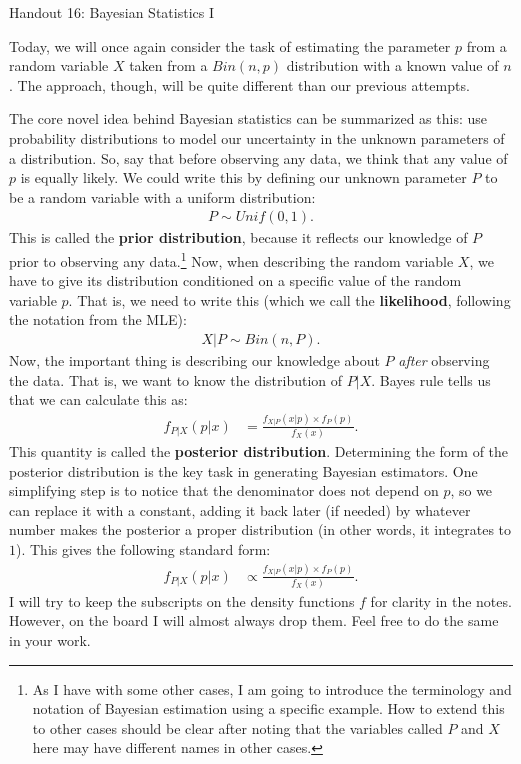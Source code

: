 \documentclass{tufte-handout}
\begin{document}
\justify

{\LARGE Handout 16: Bayesian Statistics I}

\vspace*{18pt}

\noindent
Today, we will once again consider the task of estimating the 
parameter $p$ from a random variable $X$ taken from a $Bin(n, p)$
distribution with a known value of $n$. The approach, though,
will be quite different than our previous attempts. 

The core novel idea behind Bayesian statistics can be summarized
as this: use probability distributions to model our uncertainty in
the unknown parameters of a distribution. So, say that before 
observing any data, we think that any value of $p$ is equally
likely. We could write this by defining our unknown parameter $P$
to be a random variable with a uniform distribution:
\begin{align*}
P \sim Unif(0, 1).
\end{align*}
This is called the \textbf{prior distribution}, because it reflects
our knowledge of $P$ prior to observing any data.\footnote{
  As I have with some other cases, I am going to introduce the
  terminology and notation of Bayesian estimation using a specific
  example. How to extend this to other cases should be clear after
  noting that the variables called $P$ and $X$ here may have different
  names in other cases.
}
Now, when describing
the random variable $X$, we have to give its distribution conditioned
on a specific value of the random variable $p$. That is, we need to
write this (which we call the \textbf{likelihood}, following the notation
from the MLE):
\begin{align*}
X|P \sim Bin(n, P).
\end{align*}
Now, the important thing is describing our knowledge about $P$ \textit{after}
observing the data. That is, we want to know the distribution of $P | X$.
Bayes rule tells us that we can calculate this as:
\begin{align*}
f_{P|X}(p|x) &= \frac{f_{X|P}(x|p) \times f_{P}(p)}{f_{X}(x)}.
\end{align*}
This quantity is called the \textbf{posterior distribution}. Determining
the form of the posterior distribution is the key task in generating
Bayesian estimators. One simplifying step is to notice that the denominator
does not depend on $p$, so we can replace it with a constant, adding it
back later (if needed) by whatever number makes the posterior a proper
distribution (in other words, it integrates to $1$). This gives the following
standard form:
\begin{align*}
f_{P|X}(p|x) &\propto \frac{f_{X|P}(x|p) \times f_{P}(p)}{f_{X}(x)}.
\end{align*}
I will try to keep the subscripts on the density functions $f$
for clarity in the notes. However, on the board I will almost always drop
them. Feel free to do the same in your work.
\end{document}
